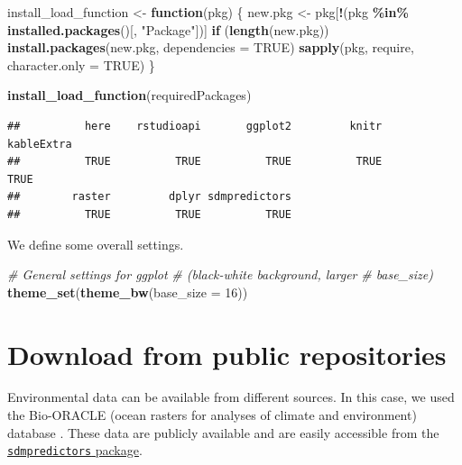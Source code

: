 \documentclass[
]{book}
\newenvironment{Shaded}{\begin{snugshade}}{\end{snugshade}}
\newcommand{\AttributeTok}[1]{\textcolor[rgb]{0.13,0.29,0.53}{#1}}
\newcommand{\CommentTok}[1]{\textcolor[rgb]{0.56,0.35,0.01}{\textit{#1}}}
\newcommand{\ConstantTok}[1]{\textcolor[rgb]{0.56,0.35,0.01}{#1}}
\newcommand{\ControlFlowTok}[1]{\textcolor[rgb]{0.13,0.29,0.53}{\textbf{#1}}}
\newcommand{\DecValTok}[1]{\textcolor[rgb]{0.00,0.00,0.81}{#1}}
\newcommand{\FunctionTok}[1]{\textcolor[rgb]{0.13,0.29,0.53}{\textbf{#1}}}
\newcommand{\NormalTok}[1]{#1}
\newcommand{\OtherTok}[1]{\textcolor[rgb]{0.56,0.35,0.01}{#1}}
\newcommand{\SpecialCharTok}[1]{\textcolor[rgb]{0.81,0.36,0.00}{\textbf{#1}}}
\newcommand{\StringTok}[1]{\textcolor[rgb]{0.31,0.60,0.02}{#1}}
\begin{document}
\begin{Shaded}
\begin{Highlighting}[]
\NormalTok{install\_load\_function }\OtherTok{\textless{}{-}} \ControlFlowTok{function}\NormalTok{(pkg) \{}
\NormalTok{    new.pkg }\OtherTok{\textless{}{-}}\NormalTok{ pkg[}\SpecialCharTok{!}\NormalTok{(pkg }\SpecialCharTok{\%in\%} \FunctionTok{installed.packages}\NormalTok{()[,}
        \StringTok{"Package"}\NormalTok{])]}
    \ControlFlowTok{if}\NormalTok{ (}\FunctionTok{length}\NormalTok{(new.pkg))}
        \FunctionTok{install.packages}\NormalTok{(new.pkg, }\AttributeTok{dependencies =} \ConstantTok{TRUE}\NormalTok{)}
    \FunctionTok{sapply}\NormalTok{(pkg, require, }\AttributeTok{character.only =} \ConstantTok{TRUE}\NormalTok{)}
\NormalTok{\}}

\FunctionTok{install\_load\_function}\NormalTok{(requiredPackages)}
\end{Highlighting}
\end{Shaded}

\begin{verbatim}
##          here    rstudioapi       ggplot2         knitr    kableExtra 
##          TRUE          TRUE          TRUE          TRUE          TRUE 
##        raster         dplyr sdmpredictors 
##          TRUE          TRUE          TRUE
\end{verbatim}

We define some overall settings.

\begin{Shaded}
\begin{Highlighting}[]
\CommentTok{\# General settings for ggplot}
\CommentTok{\# (black{-}white background, larger}
\CommentTok{\# base\_size)}
\FunctionTok{theme\_set}\NormalTok{(}\FunctionTok{theme\_bw}\NormalTok{(}\AttributeTok{base\_size =} \DecValTok{16}\NormalTok{))}
\end{Highlighting}
\end{Shaded}

\section{Download from public repositories}\label{download-from-public-repositories}

Environmental data can be available from different sources. In this case, we used the Bio-ORACLE (ocean
rasters for analyses of climate and environment) database \citep{tyberghein_etal_2012, assis_etal_2017}. These data are publicly available and are easily accessible from the \href{https://cran.r-project.org/web/packages/sdmpredictors/index.html}{\texttt{sdmpredictors} package}.
\end{document}
